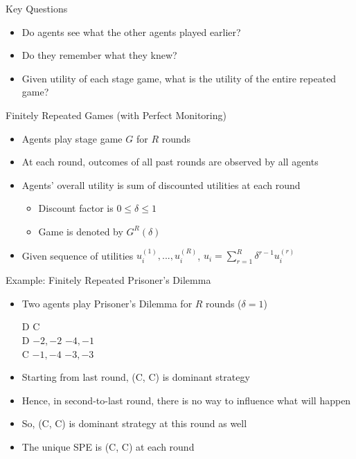 \documentclass[11pt,aspectratio=169,handout]{beamer}
\begin{document}
  \begin{frame}{Key Questions}
   \begin{itemize}
   \setlength{\itemsep}{1.2em}
    \item Do agents see what the other agents played earlier?
    \item Do they remember what they knew?
    \item Given utility of each stage game, what is the utility of the entire repeated game?
   \end{itemize}
  \end{frame}
  
  
  \begin{frame}{Finitely Repeated Games (with Perfect Monitoring)}
   \begin{itemize}[<+->]
   \setlength{\itemsep}{1.2em}
    \item Agents play stage game $G$ for $R$ rounds
    \item At each round, outcomes of all past rounds are observed by all agents
    \item Agents' overall utility is sum of \alert{discounted utilities} at each round
    \begin{itemize}[<.->]
     \item Discount factor is $ 0 \le \delta \le 1$
     \item Game is denoted by $G^{R}(\delta)$
    \end{itemize}
    \item Given sequence of utilities $u_i^{(1)}, ..., u_i^{(R)}$, $u_i = \sum_{r=1}^{R}\delta^{r-1} u_i^{(r)}$
   \end{itemize}
  \end{frame}
 
 
  \begin{frame}{Example: Finitely Repeated Prisoner's Dilemma}
   \begin{itemize}[<+->]
    \item Two agents play Prisoner's Dilemma for $R$ rounds ($\delta = 1$)
    \begin{center}
     \hspace{-3.5em}
     \begin{game}{2}{2}
      		\> D			\> C			\\
      D		\> $-2,-2$	\> $-4,-1$	\\
      C		\> $-1,-4$	\> $-3,-3$
     \end{game}
    \end{center}
    \vspace{0.7em}  
    \item Starting from last round, (C, C) is dominant strategy
    \item Hence, in second-to-last round, there is no way to influence what will happen
    \item So, (C, C) is dominant strategy at this round as well
    \item The unique SPE is (C, C) at each round
   \end{itemize}
  \end{frame}
  
\end{document}
